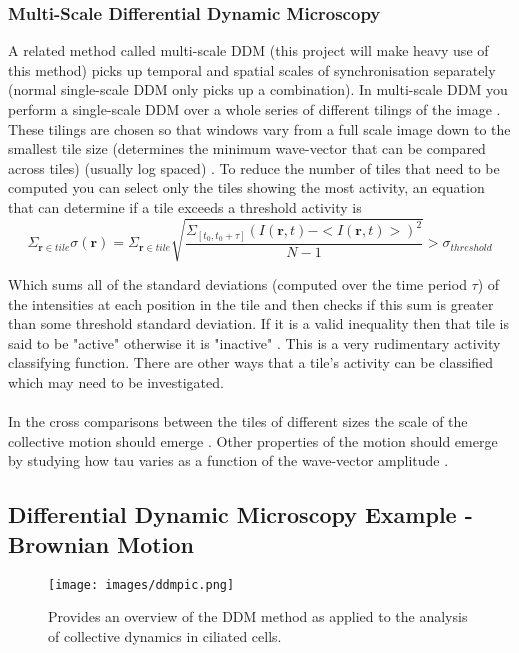 \documentclass[11pt]{article}
\begin{document}
\subsubsection{Multi-Scale Differential Dynamic Microscopy}
A related method called multi-scale DDM (this project will make heavy use of this method) picks up temporal and spatial scales of synchronisation separately (normal single-scale DDM only picks up a combination).
In multi-scale DDM you perform a single-scale DDM over a whole series of different tilings of the image \cite{ddm1}. These tilings are chosen so that windows vary from a full scale image down to the smallest tile size (determines the minimum wave-vector that can be compared across tiles) (usually log spaced) \cite{ddm1}.
To reduce the number of tiles that need to be computed you can select only the tiles showing the most activity, an equation that can determine if a tile exceeds a threshold activity is
\begin{equation}
    \Sigma_{\textbf{r} \in tile} \sigma(\textbf{r}) = \Sigma_{\textbf{r} \in tile} \sqrt{\frac{\Sigma_{[t_0, t_0 + \tau]} (I(\mathbf{r}, t) - <I(\mathbf{r}, t)>)^2}{N - 1}} > \sigma_{threshold}
\end{equation}

Which sums all of the standard deviations (computed over the time period $\tau$) of the intensities at each position in the tile and then checks if this sum is greater than some threshold standard deviation.
If it is a valid inequality then that tile is said to be "active" otherwise it is "inactive" \cite{ddm2}.
This is a very rudimentary activity classifying function.
There are other ways that a tile's activity can be classified which may need to be investigated.
\\\\
In the cross comparisons between the tiles of different sizes the scale of the collective motion should emerge \cite{ddm1}.
Other properties of the motion should emerge by studying how tau varies as a function of the wave-vector amplitude \cite{ddm1}.

\subsection{Differential Dynamic Microscopy Example - Brownian Motion}

\begin{figure}[H]
\centering
\texttt{[image: images/ddmpic.png]}
\caption{Provides an overview of the DDM method as applied to the analysis of collective dynamics in ciliated cells.\cite{ddm2}}
\end{figure}
\end{document}
